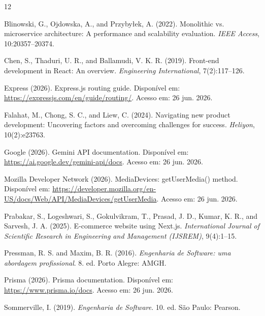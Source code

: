\documentclass[12pt]{article}
\begin{document}
\begin{thebibliography}{12}

Blinowski, G., Ojdowska, A., and Przyby\l{}ek, A. (2022). Monolithic vs. microservice architecture: A performance and scalability evaluation. {\em IEEE Access}, 10:20357--20374.

Chen, S., Thaduri, U. R., and Ballamudi, V. K. R. (2019). Front-end development in React: An overview. {\em Engineering International}, 7(2):117--126.

Express (2026). Express.js routing guide. Disponível em: \url{https://expressjs.com/en/guide/routing/}. Acesso em: 26 jun. 2026.

Falahat, M., Chong, S. C., and Liew, C. (2024). Navigating new product development: Uncovering factors and overcoming challenges for success. {\em Heliyon}, 10(2):e23763.

Google (2026). Gemini API documentation. Disponível em: \url{https://ai.google.dev/gemini-api/docs}. Acesso em: 26 jun. 2026.

Mozilla Developer Network (2026). MediaDevices: getUserMedia() method. Disponível em: \url{https://developer.mozilla.org/en-US/docs/Web/API/MediaDevices/getUserMedia}. Acesso em: 26 jun. 2026.

Prabakar, S., Logeshwari, S., Gokulvikram, T., Prasad, J. D., Kumar, K. R., and Sarvesh, J. A. (2025). E-commerce website using Next.js. {\em International Journal of Scientific Research in Engineering and Management (IJSREM)}, 9(4):1--15.

Pressman, R. S. and Maxim, B. R. (2016). {\em Engenharia de Software: uma abordagem profissional}. 8. ed. Porto Alegre: AMGH.

Prisma (2026). Prisma documentation. Disponível em: \url{https://www.prisma.io/docs}. Acesso em: 26 jun. 2026.

Sommerville, I. (2019). {\em Engenharia de Software}. 10. ed. São Paulo: Pearson.

\end{thebibliography}
\end{document}
